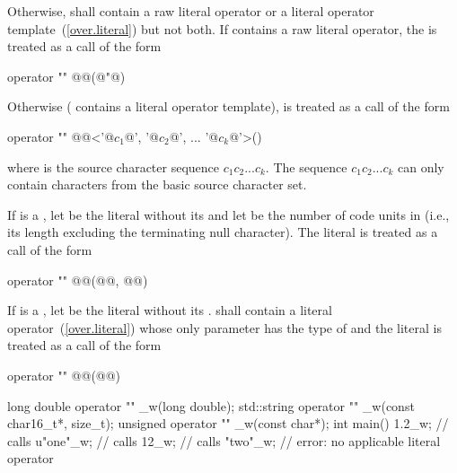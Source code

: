 Otherwise,  shall contain a raw literal operator or a literal operator
template~(\ref{over.literal}) but not both. If  contains a raw literal operator,
the   is treated as a call of the form

\begin{codeblock}
operator "" @@(@"@)
\end{codeblock}

Otherwise ( contains a literal operator template),  is treated as a call
of the form

\begin{codeblock}
operator "" @@<'@$c_1$@', '@$c_2$@', ... '@$c_k$@'>()
\end{codeblock}

where  is the source character sequence $c_1c_2...c_k$. \enternote The sequence
$c_1c_2...c_k$ can only contain characters from the basic source character set.
\exitnote

\pnum
If  is a , let  be the
literal without its  and let  be
the number of
code units in  (i.e., its length excluding the terminating
null character).
 The literal  is treated as a call of the form

\begin{codeblock}
operator "" @@(@@, @@)
\end{codeblock}

\pnum
If  is a , let  be the
literal without its .
 shall contain a literal operator~(\ref{over.literal}) whose only parameter has
the type of  and the
literal  is treated as a call
of the form

\begin{codeblock}
operator "" @@(@@)
\end{codeblock}

\pnum
\enterexample

\begin{codeblock}
long double operator "" _w(long double);
std::string operator "" _w(const char16_t*, size_t);
unsigned operator "" _w(const char*);
int main() {
  1.2_w;      // calls 
  u"one"_w;   // calls 
  12_w;       // calls 
  "two"_w;    // error: no applicable literal operator
}
\end{codeblock}

